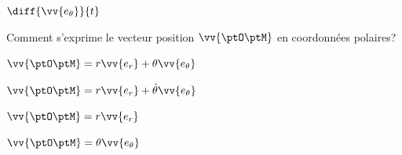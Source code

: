 

\begin{enonce}
	$\diff{\vv{e_\theta}}{t}$
\end{enonce}



\finEntrainement







\hauteurLargeurCadreReponse		{8mm}{1.5cm}
\initialisationEntrainement


\debutEntrainement


\begin{enonce}
	Comment s'exprime le vecteur position $\vv{\ptO \ptM}$ en coordonnées polaires? 
	
	\begin{listeQCM2Colonnes}
	\item $\vv{\ptO \ptM} = r\vv{e_r} + \theta \vv{e_\theta}$
	\item $\vv{\ptO \ptM} = r\vv{e_r} + \dot{\theta} \vv{e_\theta}$
	\item $\vv{\ptO \ptM} = r\vv{e_r}$
	\item $\vv{\ptO \ptM} = \theta \vv{e_\theta}$
	\end{listeQCM2Colonnes}
		
\end{enonce}

